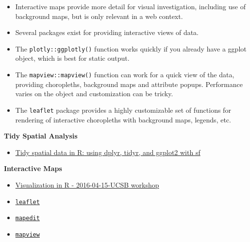 \documentclass[]{book}
\providecommand{\tightlist}{%
  \setlength{\itemsep}{0pt}\setlength{\parskip}{0pt}}
\theoremstyle{definition}
\theoremstyle{definition}
\theoremstyle{definition}
\theoremstyle{remark}
\begin{document}
\begin{itemize}
\tightlist
\item
  Interactive maps provide more detail for visual investigation,
  including use of background maps, but is only relevant in a web
  context.
\item
  Several packages exist for providing interactive views of data.
\item
  The \texttt{plotly::ggplotly()} function works quickly if you already
  have a ggplot object, which is best for static output.
\item
  The \texttt{mapview::mapview()} function can work for a quick view of
  the data, providing choropleths, background maps and attribute popups.
  Performance varies on the object and customization can be tricky.
\item
  The \texttt{leaflet} package provides a highly customizable set of
  functions for rendering of interactive choropleths with background
  maps, legends, etc.
\end{itemize}

\textbf{Tidy Spatial Analysis}

\begin{itemize}
\tightlist
\item
  \href{http://strimas.com/r/tidy-sf/}{Tidy spatial data in R: using
  dplyr, tidyr, and ggplot2 with sf}
\end{itemize}

\textbf{Interactive Maps}

\begin{itemize}
\tightlist
\item
  \href{http://remi-daigle.github.io/2016-04-15-UCSB/viz/}{Visualization
  in R - 2016-04-15-UCSB workshop}
\item
  \href{http://rstudio.github.io/leaflet/}{\texttt{leaflet}}
\item
  \href{http://r-spatial.org/r/2017/01/30/mapedit_intro.html}{\texttt{mapedit}}
\item
  \href{https://r-spatial.github.io/mapview/}{\texttt{mapview}}
\end{itemize}
\end{document}
